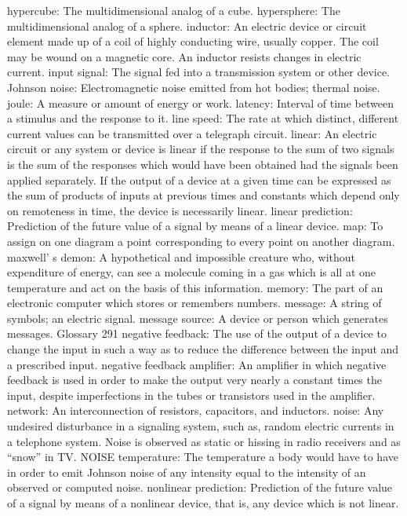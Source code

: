 {{{{{{{{{{{{{{{hypercube: The multidimensional analog of a cube.
hypersphere: The multidimensional analog of a sphere.
inductor: An electric device or circuit element made up of a coil of highly
conducting wire, usually copper. The coil may be wound on a
magnetic core. An inductor resists changes in electric current.
input signal: The signal fed into a transmission system or other device.
Johnson noise: Electromagnetic noise emitted from hot bodies; thermal
noise.
joule: A measure or amount of energy or work.
latency: Interval of time between a stimulus and the response to it.
line speed: The rate at which distinct, different current values can be
transmitted over a telegraph circuit.
linear: An electric circuit or any system or device is linear if the response
to the sum of two signals is the sum of the responses which would
have been obtained had the signals been applied separately. If the
output of a device at a given time can be expressed as the sum of
products of inputs at previous times and constants which depend
only on remoteness in time, the device is necessarily linear.
linear prediction: Prediction of the future value of a signal by means
of a linear device.
map: To assign on one diagram a point corresponding to every point on
another diagram.
maxwell’
s demon: A hypothetical and impossible creature who, without
expenditure of energy, can see a molecule coming in a gas which
is all at one temperature and act on the basis of this information.
memory: The part of an electronic computer which stores or remembers
numbers.
message: A string of symbols; an electric signal.
message source: A device or person which generates messages.
Glossary 291
negative feedback: The use of the output of a device to change the
input in such a way as to reduce the difference between the input
and a prescribed input.
negative feedback amplifier: An amplifier in which negative feedback
is used in order to make the output very nearly a constant times
the input, despite imperfections in the tubes or transistors used in
the amplifier.
network: An interconnection of resistors, capacitors, and inductors.
noise: Any undesired disturbance in a signaling system, such as, random
electric currents in a telephone system. Noise is observed as static
or hissing in radio receivers and as “snow” in TV.
NOISE temperature: The temperature a body would have to have in order
to emit Johnson noise of any intensity equal to the intensity of an
observed or computed noise.
nonlinear prediction: Prediction of the future value of a signal by
means of a nonlinear device, that is, any device which is not linear.
}}}}}}}}}}}}}}}
